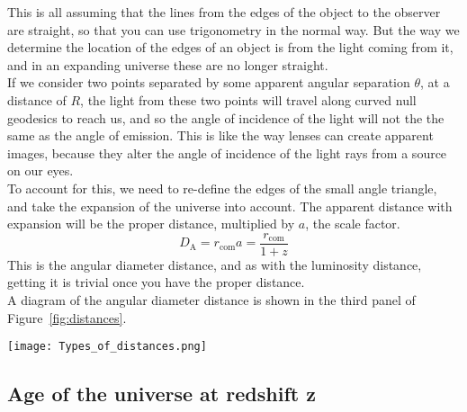 \documentclass[]{article}
\begin{document}
\noindent This is all assuming that the lines from the edges of the object to the observer are straight, so that you can use trigonometry in the normal way. But the way we determine the location of the edges of an object is from the light coming from it, and in an expanding universe these are no longer straight. \\

\noindent If we consider two points separated by some apparent angular separation $\theta$, at a distance of $R$, the light from these two points will travel along curved null geodesics to reach us, and so the angle of incidence of the light will not the the same as the angle of emission. This is like the way lenses can create apparent images, because they alter the angle of incidence of the light rays from a source on our eyes. \\

\noindent To account for this, we need to re-define the edges of the small angle triangle, and take the expansion of the universe into account. The apparent distance with expansion will be the proper distance, multiplied by $a$, the scale factor. 
\begin{equation}
\boxed{D_\mathrm{A} = r_\mathrm{com} a = \frac{r_\mathrm{com}}{1+z}}
\end{equation}
This is the angular diameter distance, and as with the luminosity distance, getting it is trivial once you have the proper distance. \\

\noindent A diagram of the angular diameter distance is shown in the third panel of Figure~\ref{fig:distances}.

\begin{figure*}[h!]
\hspace*{-2.7cm}
\texttt{[image: Types\_of\_distances.png]}
\caption{The three types of distances: Proper distance, luminosity distance and angular diameter distance.}
\label{fig:distances}
\end{figure*}

\subsection{Age of the universe at redshift z}
\end{document}
